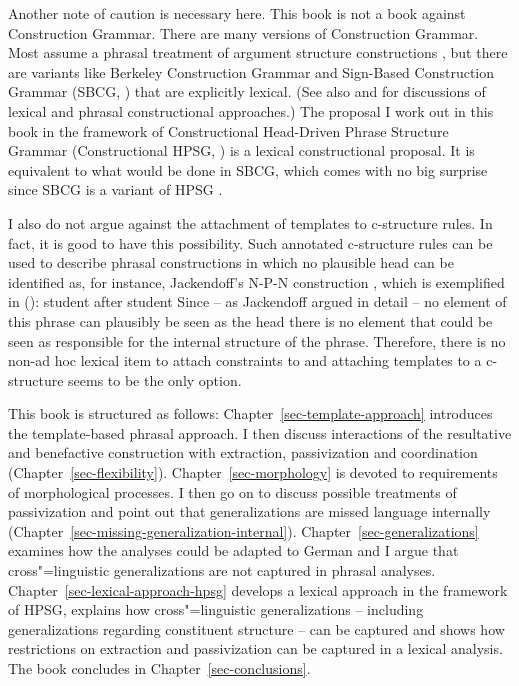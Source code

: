 Another note of caution is necessary here. This book is not a book against Construction
Grammar. There are many versions of Construction Grammar. Most assume a phrasal treatment of
argument structure constructions
\citep{Tomasello2003a,Goldberg95a,Goldberg2006a,GJ2004a,BC2005a,vanTrijp2011a}, but there are variants
like Berkeley Construction Grammar \citep{Kay2005a} and Sign-Based Construction Grammar (SBCG, \citealp*{SBK2012a}) that are explicitly lexical. (See also  and 
for discussions of lexical and phrasal constructional approaches.) The proposal I work out in this
book in the framework of Constructional Head-Driven Phrase Structure Grammar (Constructional HPSG,
\citealp{Sag97a}) is a lexical constructional proposal. It is equivalent to what would be done in
SBCG, which comes with no big surprise since SBCG is a variant of HPSG \citep[486]{Sag2010b}.

I also do not argue against the attachment of templates to c-structure rules. In fact, it is good to
have this possibility. Such annotated c-structure rules can be used to describe phrasal constructions in which no plausible head
can be identified as, for instance, Jackendoff's N-P-N construction \citeyearpar{Jackendoff2008a}, which is exemplified in
():
\ea
student after student
\z
Since -- as Jackendoff argued in detail -- no element of this phrase can plausibly be seen as the head
there is no element that could be seen as responsible for the internal structure of the
phrase. Therefore, there is no non-ad hoc lexical item to attach constraints to and attaching
templates to a c-structure seems to be the only option.

This book is structured as follows: Chapter~\ref{sec-template-approach} introduces the
template-based phrasal approach. I then discuss interactions of the resultative
and benefactive construction with extraction, passivization and coordination
(Chapter~\ref{sec-flexibility}). Chapter~\ref{sec-morphology} is devoted to requirements of
morphological processes. 
I then go on to discuss possible
treatments of passivization and point out that generalizations are missed language internally
(Chapter~\ref{sec-missing-generalization-internal}).
Chapter~\ref{sec-generalizations} examines how the analyses could be adapted to German and I argue
that cross"=linguistic generalizations are not captured in phrasal
analyses. Chapter~\ref{sec-lexical-approach-hpsg} develops a lexical approach in the framework of
HPSG, explains how cross"=linguistic generalizations -- including generalizations regarding
constituent structure -- can be captured and shows how restrictions on
extraction and passivization can be captured in a lexical analysis. The book concludes in Chapter~\ref{sec-conclusions}.



